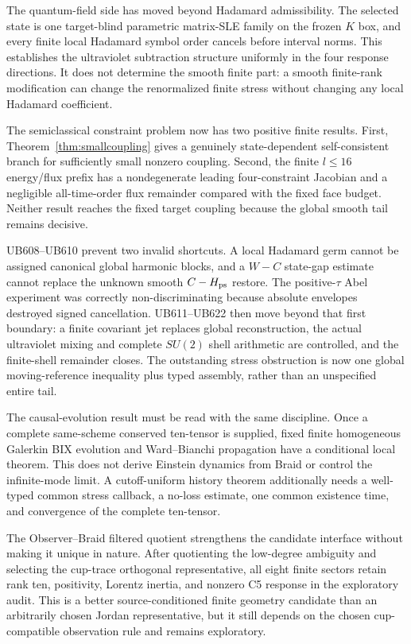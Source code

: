 \documentclass[11pt]{article}
\theoremstyle{definition}
\theoremstyle{remark}
\begin{document}
The quantum-field side has moved beyond Hadamard admissibility. The selected state is one target-blind parametric matrix-SLE family on the frozen $K$ box, and every finite local Hadamard symbol order cancels before interval norms. This establishes the ultraviolet subtraction structure uniformly in the four response directions. It does not determine the smooth finite part: a smooth finite-rank modification can change the renormalized finite stress without changing any local Hadamard coefficient.

The semiclassical constraint problem now has two positive finite results. First, Theorem~\ref{thm:smallcoupling} gives a genuinely state-dependent self-consistent branch for sufficiently small nonzero coupling. Second, the finite $l\le16$ energy/flux prefix has a nondegenerate leading four-constraint Jacobian and a negligible all-time-order flux remainder compared with the fixed face budget. Neither result reaches the fixed target coupling because the global smooth tail remains decisive.

UB608--UB610 prevent two invalid shortcuts. A local Hadamard germ cannot be assigned canonical global harmonic blocks, and a $W-C$ state-gap estimate cannot replace the unknown smooth $C-H_{\rm ps}$ restore. The positive-$\tau$ Abel experiment was correctly non-discriminating because absolute envelopes destroyed signed cancellation. UB611--UB622 then move beyond that first boundary: a finite covariant jet replaces global reconstruction, the actual ultraviolet mixing and complete $SU(2)$ shell arithmetic are controlled, and the finite-shell remainder closes. The outstanding stress obstruction is now one global moving-reference inequality plus typed assembly, rather than an unspecified entire tail.

The causal-evolution result must be read with the same discipline. Once a complete same-scheme conserved ten-tensor is supplied, fixed finite homogeneous Galerkin BIX evolution and Ward--Bianchi propagation have a conditional local theorem. This does not derive Einstein dynamics from Braid or control the infinite-mode limit. A cutoff-uniform history theorem additionally needs a well-typed common stress callback, a no-loss estimate, one common existence time, and convergence of the complete ten-tensor.

The Observer--Braid filtered quotient strengthens the candidate interface without making it unique in nature. After quotienting the low-degree ambiguity and selecting the cup-trace orthogonal representative, all eight finite sectors retain rank ten, positivity, Lorentz inertia, and nonzero C5 response in the exploratory audit. This is a better source-conditioned finite geometry candidate than an arbitrarily chosen Jordan representative, but it still depends on the chosen cup-compatible observation rule and remains exploratory.
\end{document}
